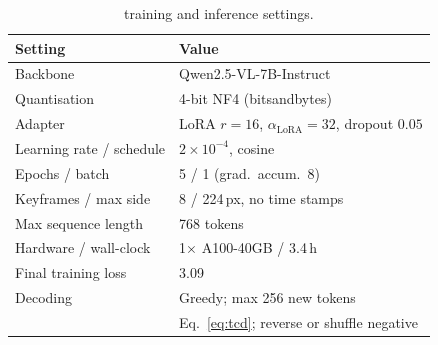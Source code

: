 \begin{table}[!t]
\centering
\caption{\crashlogic{} training and inference settings.}
\label{tab:hyperparams}
\small
\begin{tabular}{@{}ll@{}}
\toprule
\textbf{Setting} & \textbf{Value} \\
\midrule
Backbone & Qwen2.5-VL-7B-Instruct \\
Quantisation & 4-bit NF4 (bitsandbytes) \\
Adapter & LoRA $r{=}16$, $\alpha_{\mathrm{LoRA}}{=}32$, dropout $0.05$ \\
Learning rate / schedule & $2{\times}10^{-4}$, cosine \\
Epochs / batch & 5 / 1 (grad.\ accum.\ 8) \\
Keyframes / max side & 8 / 224\,px, no time stamps \\
Max sequence length & 768 tokens \\
Hardware / wall-clock & 1$\times$ A100-40GB / 3.4\,h \\
Final training loss & 3.09 \\
Decoding & Greedy; max 256 new tokens \\
\tcd{} & Eq.~\eqref{eq:tcd}; reverse or shuffle negative \\
\bottomrule
\end{tabular}
\end{table}

